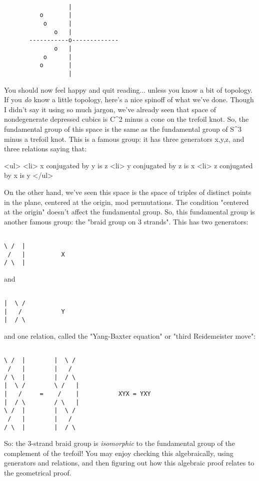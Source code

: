 \begin{verbatim}

                  |
          o       |      
           o      |     
              o   |  
       -----------o-------------
              o   |           
           o      |     
          o       |
                  |
\end{verbatim}
    
You should now feel happy and quit reading... unless you
know a bit of topology.  If you \emph{do} know a little topology, 
here's a nice spinoff of what we've done.   Though I didn't say
it using so much jargon, we've already seen that space of 
nondegenerate depressed cubics is C^{2} minus a cone on the 
trefoil knot.  So, the fundamental group of this space is the
same as the fundamental group of S^{3} minus a trefoil knot.  
This is a famous group: it has three generators x,y,z, and three 
relations saying that:

<ul>
<li>
x conjugated by y is z 
<li>
y conjugated by z is x 
<li>
z conjugated by x is y 
</ul>

On the other hand, we've seen this space is the space of triples
of distinct points in the plane, centered at the origin, mod 
permutations.   The condition "centered at the origin"
doesn't affect the fundamental group.  So, this fundamental 
group is another famous group: the "braid group on 3 strands".  
This has two generators:


\begin{verbatim}

\ /  |
 /   |          X
/ \  |
\end{verbatim}
    
and


\begin{verbatim}

|  \ /
|   /           Y
|  / \
\end{verbatim}
    
and one relation, called the "Yang-Baxter equation" or "third 
Reidemeister move":


\begin{verbatim}

\ /  |        |  \ /
 /   |        |   /
/ \  |        |  / \
|  \ /        \ /   |
|   /     =    /    |           XYX = YXY
|  / \        / \   |
\ /  |        |  \ /
 /   |        |   /
/ \  |        |  / \
\end{verbatim}
    
So: the 3-strand braid group is \emph{isomorphic} to the fundamental 
group of the complement of the trefoil!  You may enjoy checking 
this algebraically, using generators and relations, and then 
figuring out how this algebraic proof relates to the geometrical 
proof.

